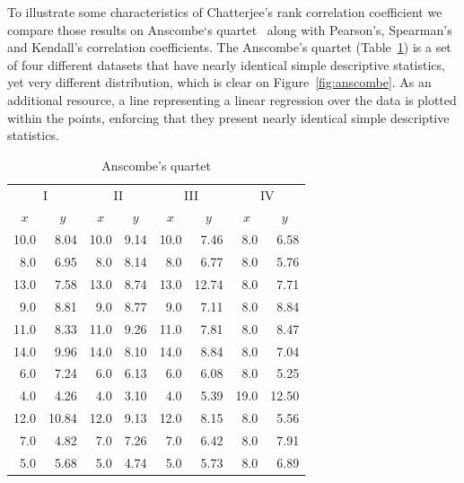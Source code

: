 To illustrate some characteristics of Chatterjee's rank correlation coefficient we compare those results on Anscombe`s quartet~\citep{anscombe1973} along with Pearson's, Spearman's and Kendall's correlation coefficients. The Anscombe's quartet (Table~\ref{tab:anscombe}) is a set of four different datasets that have nearly identical simple descriptive statistics, yet very different distribution, which is clear on Figure~\ref{fig:anscombe}. As an additional resource, a line representing a linear regression over the data is plotted within the points, enforcing that they present nearly identical simple descriptive statistics.

\begin{table}[ht]
\centering
\caption{Anscombe's quartet}
\label{tab:anscombe}
\begin{tabular}{rr|rr|rr|rr}
\toprule
\multicolumn{2}{c|}{I} & \multicolumn{2}{c|}{II} & \multicolumn{2}{c|}{III} & \multicolumn{2}{c}{IV} \\

\multicolumn{1}{c}{$x$} & \multicolumn{1}{c|}{$y$} & \multicolumn{1}{c}{$x$} & \multicolumn{1}{c|}{$y$} & \multicolumn{1}{c}{$x$} & \multicolumn{1}{c|}{$y$} & \multicolumn{1}{c}{$x$} & \multicolumn{1}{c}{$y$} \\
\midrule
10.0 & 8.04 & 10.0 & 9.14 & 10.0 & 7.46 & 8.0 & 6.58 \\
8.0 & 6.95 & 8.0 & 8.14 & 8.0 & 6.77 & 8.0 & 5.76 \\
13.0 & 7.58 & 13.0 & 8.74 & 13.0 & 12.74 & 8.0 & 7.71 \\
9.0 & 8.81 & 9.0 & 8.77 & 9.0 & 7.11 & 8.0 & 8.84 \\
11.0 & 8.33 & 11.0 & 9.26 & 11.0 & 7.81 & 8.0 & 8.47 \\
14.0 & 9.96 & 14.0 & 8.10 & 14.0 & 8.84 & 8.0 & 7.04 \\
6.0 & 7.24 & 6.0 & 6.13 & 6.0 & 6.08 & 8.0 & 5.25 \\
4.0 & 4.26 & 4.0 & 3.10 & 4.0 & 5.39 & 19.0 & 12.50 \\
12.0 & 10.84 & 12.0 & 9.13 & 12.0 & 8.15 & 8.0 & 5.56 \\
7.0 & 4.82 & 7.0 & 7.26 & 7.0 & 6.42 & 8.0 & 7.91 \\
5.0 & 5.68 & 5.0 & 4.74 & 5.0 & 5.73 & 8.0 & 6.89 \\
\bottomrule
\end{tabular}
\end{table}

